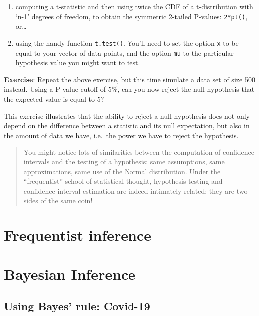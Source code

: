 \documentclass[
]{book}
\begin{document}
\begin{enumerate}
\def\labelenumi{\arabic{enumi}.}
\item
  computing a t-statistic and then using twice the CDF of a t-distribution with `n-1' degrees of freedom, to obtain the symmetric 2-tailed P-values: \texttt{2*pt()}, or\ldots{}
\item
  using the handy function \texttt{t.test()}. You'll need to set the option \texttt{x} to be equal to your vector of data points, and the option \texttt{mu} to the particular hypothesis value you might want to test.
\end{enumerate}

\textbf{Exercise}: Repeat the above exercise, but this time simulate a data set of size 500 instead. Using a P-value cutoff of \(5\%\), can you now reject the null hypothesis that the expected value is equal to 5?

This exercise illustrates that the ability to reject a null hypothesis does not only depend on the difference between a statistic and its null expectation, but also in the amount of data we have, i.e.~the power we have to reject the hypothesis.

\begin{quote}
You might notice lots of similarities between the computation of confidence intervals and the testing of a hypothesis: same assumptions, same approximations, same use of the Normal distribution. Under the ``frequentist'' school of statistical thought, hypothesis testing and confidence interval estimation are indeed intimately related: they are two sides of the same coin!
\end{quote}

\hypertarget{frequentist-inference}{%
\chapter{Frequentist inference}\label{frequentist-inference}}

\hypertarget{bayesian-inference}{%
\chapter{Bayesian Inference}\label{bayesian-inference}}

\hypertarget{using-bayes-rule-covid-19}{%
\section{Using Bayes' rule: Covid-19}\label{using-bayes-rule-covid-19}}
\end{document}
